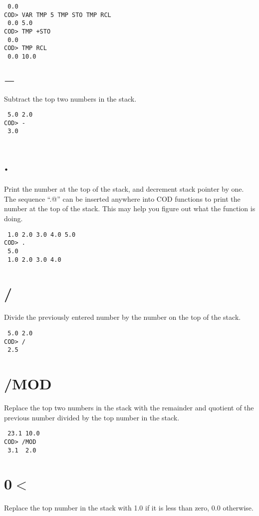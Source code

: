 \medskip
{}
\begin{verbatim}
 0.0
COD> VAR TMP 5 TMP STO TMP RCL
 0.0 5.0
COD> TMP +STO
 0.0
COD> TMP RCL
 0.0 10.0
\end{verbatim}

\section*{$-$}
Subtract the top two numbers in the stack.

\medskip
{}
\begin{verbatim}
 5.0 2.0
COD> -
 3.0
\end{verbatim}

\section*{.}
Print the number at the top of the stack,
and decrement stack pointer by one.
The sequence ``\verb@DUP .@'' can be inserted anywhere into COD functions
to print the number at the top of the stack.
This may help you figure out what the function is doing.

\medskip
{}
\begin{verbatim}
 1.0 2.0 3.0 4.0 5.0
COD> .
 5.0
 1.0 2.0 3.0 4.0
\end{verbatim}

\section*{/}
Divide the previously entered number by the number on the top of the stack.

\medskip
{}
\begin{verbatim}
 5.0 2.0
COD> /
 2.5
\end{verbatim}

\section*{/MOD}
Replace the top two numbers in the stack with the remainder
and quotient of the previous number divided by the top number in the stack.

\medskip
{}
\begin{verbatim}
 23.1 10.0
COD> /MOD
 3.1  2.0
\end{verbatim}

\section*{0$<$}
Replace the top number in the stack with 1.0 if it is less than zero,
0.0 otherwise.

